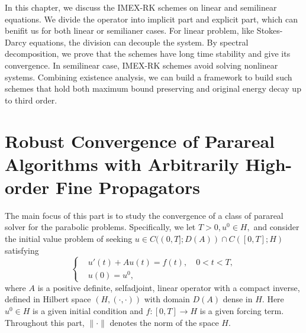 \documentclass[a4paper, oneside]{book}
\begin{document}
In this chapter, we discuss the IMEX-RK schemes on linear and semilinear equations. We divide the operator into implicit part and explicit part, which can benifit us for both linear or semilianer cases.
For linear problem, like Stokes-Darcy equations, the division can decouple the system. By spectral decomposition, we prove that the schemes have long time stability and give its convergence. 
In semilinear case, IMEX-RK schemes avoid solving nonlinear systems. Combining existence analysis, we can build a framework to build such schemes that hold both maximum bound preserving and original energy decay up to third order. 




\chapter{Robust Convergence of Parareal Algorithms with Arbitrarily High-order Fine Propagators}


The main focus of this part is to study the convergence of a class of parareal solver for the parabolic problems. Specifically,
we let $T >0, u^0\in H,$ and consider the initial value
problem of seeking $u \in C((0,T];D(A))\cap C([0,T];H)$ satisfying
%
\begin{equation}\label{eqn:pde}
\left \{
\begin{aligned}
&u' (t) + Au(t) = f(t), \quad 0<t<T,\\
& u(0)=u^0 ,
\end{aligned}
\right .
\end{equation}
%
where $A$ is a positive definite, selfadjoint, linear operator with a compact inverse, defined in
Hilbert space $(H, (\cdot , \cdot )) $ with domain $D(A)$ dense in $H$.
Here $u^0 \in H$ is a given initial condition
and $f  : [0,T] \to H$ is a given forcing term.
Throughout this part, $\| \cdot \|$ denotes the norm of the space $H$.
\end{document}
